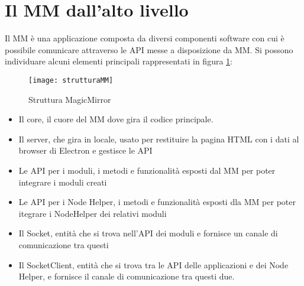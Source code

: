 \section{Il MM dall'alto livello}\label{cap:MMalto}
Il MM \`e una applicazione composta da diversi componenti software con cui \`e possibile
comunicare attraverso le API messe a disposizione da MM.
Si possono individuare alcuni elementi principali rappresentati in figura \ref{fig:struttMM}:
\begin{figure}[H]
    \texttt{[image: strutturaMM]}
    \caption{Struttura MagicMirror}
    \label{fig:struttMM}
\end{figure}
\begin{itemize}
\item Il core, il cuore del MM dove gira il codice principale.
\item Il server, che gira in locale, usato per restituire la pagina HTML con i dati al browser di Electron e gestisce le API
\item Le API per i moduli, i metodi e funzionalit\`a esposti dal MM per poter integrare i moduli creati
\item Le API per i Node Helper, i metodi e funzionalit\`a esposti dla MM per poter itegrare i NodeHelper
dei relativi moduli
\item Il Socket, entit\`a che si trova nell'API dei moduli e fornisce un canale di comunicazione tra questi
\item Il SocketClient, entit\`a che si trova tra le API delle applicazioni e dei Node Helper, e fornisce il canale
di comunicazione tra questi due.\\[2\baselineskip]
\end{itemize}

